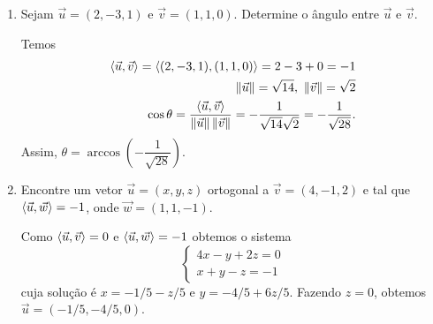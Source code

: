 \begin{exemplos}
    \begin{enumerate}
        \item Sejam $\vec{u} = (2, -3, 1)$ e $\vec{v} = (1,1, 0)$. Determine o ângulo entre $\vec{u}$ e $\vec{v}$.
              \begin{solucao}
                  Temos
                  \begin{align*}
                      \langle \vec{u}, \vec{v} \rangle = \langle(2, -3, 1), (1,1,0)\rangle = 2 - 3 + 0 = -1 \\
                      \left\Vert{\vec{u}}\right\Vert = \sqrt{14},\ \left\Vert{\vec{v}}\right\Vert = \sqrt{2}            \\
                      \cos\theta = \frac{\langle \vec{u}, \vec{v} \rangle}{\left\Vert{\vec{u}}\right\Vert\left\Vert{\vec{v}}\right\Vert} = -\dfrac{1}{\sqrt{14}\sqrt{2}} = -\dfrac{1}{\sqrt{28}}.
                  \end{align*}
                  Assim, $\theta = \arccos\left(-\dfrac{1}{\sqrt{28}}\right)$.
              \end{solucao}
        \item Encontre um vetor $\vec{u} = (x, y, z)$ ortogonal a $\vec{v} = (4, -1, 2)$ e tal que $\langle \vec{u}, \vec{w} \rangle = -1$, onde $\vec{w} = (1,1,-1)$.
              \begin{solucao}
                  Como $\langle \vec{u}, \vec{v} \rangle = 0$ e $\langle \vec{u}, \vec{w} \rangle = -1$ obtemos o sistema
                  \[
                      \begin{cases}
                          4x - y + 2z = 0 \\
                          x + y - z = -1
                      \end{cases}
                  \]
                  cuja solução é $x = -1/5 - z/5$ e $y = -4/5 + 6z/5$. Fazendo $z = 0$, obtemos $\vec{u} = (-1/5, -4/5, 0)$.
              \end{solucao}
    \end{enumerate}
\end{exemplos}

